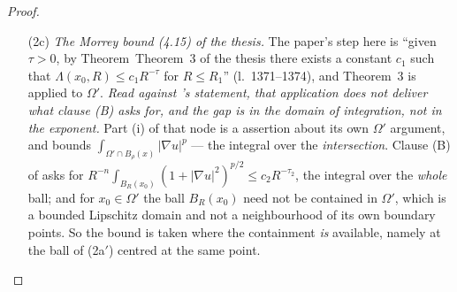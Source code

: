 \begin{proof}
\begin{enumerate}
  \emph{Its conclusion is the whole bundle, not the two inequalities, and that
  is what clause \textup{(B)} needs.}  The conclusion is
  $\mathrm{EllipticStructureQ12}\;n\;p\;\varepsilon\;\nu_0\;\nu_1\;\mathrm{univ}$
  for the normalised field
  $\mathcal A(x_0,U(x_0))-\mathcal A(x_0,U(x_0))(0)$
  () --- all six of that predicate's clauses, the
  two Carath\'eodory clauses and \texttt{hcont} and \texttt{hdiff} as well as
  (Q1) of the thesis and (Q2) of the thesis, delivered in one piece, with the structure constants
  $\gamma_0=\nu_0$ and $\gamma_1=\nu_1$ undegraded and the normalisation
  $A\mapsto A-A(0)$ of thesis l.~542 already performed inside the node.  Clause
  (B) of  asks for exactly that
  predicate, so no clause of it has to be assembled here.  \emph{This is why
  the present proof needs no promotion of the a.e.-$x$ clauses
  \textup{(Q1)}--\textup{(Q2)} to a single point (pm-0034): on the variational
  side those two inequalities arrive as a \emph{conclusion} built from
  (F1) of the thesis--(F3) of the thesis, not as a hypothesis read at $x_0$.}  The guard
  $\gamma_1\le r\gamma_0$ of clause (B) holds with equality by (1a).
\item[(2c)] \emph{The Morrey bound (4.15) of the thesis.}  The paper's step here is
  ``given $\tau>0$, by Theorem~Theorem~3 of the thesis there exists a constant $c_1$ such
  that $\Lambda(x_0,R)\le c_1R^{-\tau}$ for $R\le R_1$'' (l.~1371--1374), and
  Theorem~3 is applied to $\Omega'$.  \emph{Read against
  's statement, that application does not
  deliver what clause \textup{(B)} asks for, and the gap is in the domain of
  integration, not in the exponent.}  Part (i) of that node is a
   assertion about its own $\Omega'$ argument, and
   bounds
  $\int_{\Omega'\cap B_\rho(x)}|\nabla u|^p$ --- the integral over the
  \emph{intersection}.  Clause (B) of 
  asks for $R^{-n}\int_{B_R(x_0)}(1+|\nabla u|^2)^{p/2}\le c_2R^{-\tau_2}$, the
  integral over the \emph{whole} ball; and for $x_0\in\Omega'$ the ball
  $B_R(x_0)$ need not be contained in $\Omega'$, which is a bounded Lipschitz
  domain and not a neighbourhood of its own boundary points.  So the bound is
  taken where the containment \emph{is} available, namely at the ball of
  (2a$'$) centred at the same point.


\end{enumerate}
\end{proof}
